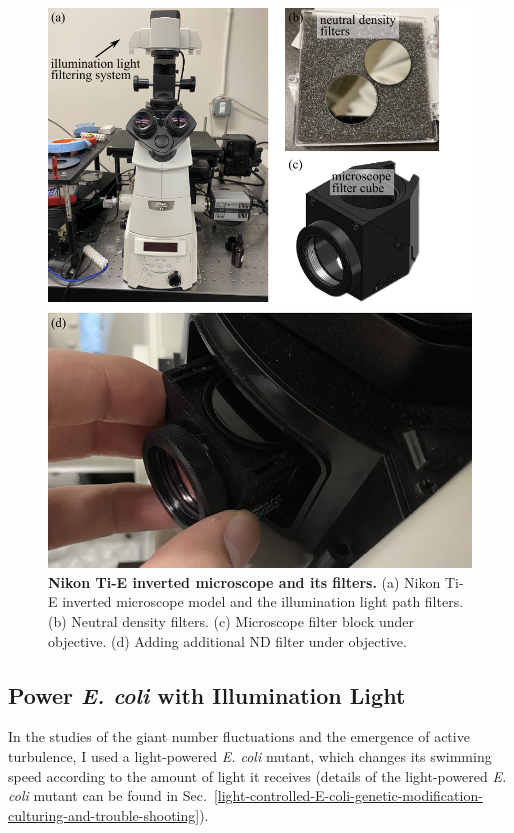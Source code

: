 \begin{figure}[!htbp]
	\begin{center}
	\includegraphics[width=4.5 in]{Figs/2-Exp/3.pdf}
	\end{center}
	\caption[Nikon Ti-E Inverted Microscope and Its Filters]
	{
	\textbf{Nikon Ti-E inverted microscope and its filters.}
	(a) Nikon Ti-E inverted microscope model and the illumination light path filters.
	(b) Neutral density filters.
	(c) Microscope filter block under objective.
	(d) Adding additional ND filter under objective.
	}
	\label{fig:microscope-and-filters}
\end{figure}

\subsection{Power \textit{E. coli} with Illumination Light}
In the studies of the giant number fluctuations and the emergence of active turbulence, I used a light-powered \textit{E. coli} mutant, which changes its swimming speed according to the amount of light it receives (details of the light-powered \textit{E. coli} mutant can be found in Sec.~\ref{light-controlled-E-coli-genetic-modification-culturing-and-trouble-shooting}).


